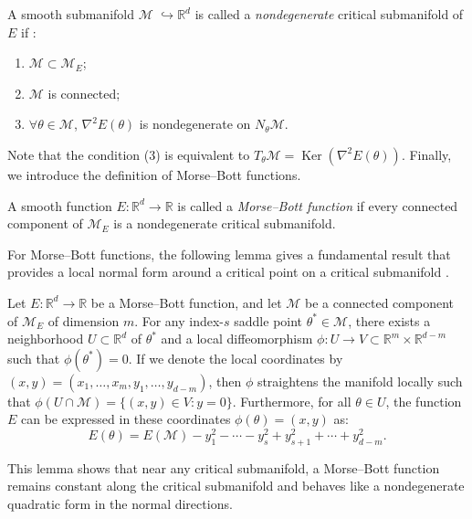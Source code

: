 \documentclass[final]{siamart251216}
\begin{document}
\begin{definition}
A smooth submanifold $\mathcal{M}$ $\hookrightarrow \mathbb{R}^d$ is called a \emph{nondegenerate} critical submanifold of $E$ if \cite{nicolaescu2007invitation}:
\begin{enumerate}
\item[(1)] $\mathcal{M}\subset \mathcal{M}_E$;
\item[(2)] $\mathcal{M}$ is connected;
\item[(3)] $\forall \theta\in \mathcal{M}$, $\nabla^2 E(\theta)$ is nondegenerate on $N_{\theta} \mathcal{M}$.
\end{enumerate}
\end{definition}
Note that the condition (3) is equivalent to $T_{\theta} \mathcal{M}=\operatorname{Ker} (\nabla^2 E(\theta))$.
Finally, we introduce the definition of Morse--Bott functions.
\begin{definition}
A smooth function $E:\mathbb{R}^d\to\mathbb{R}$ is called a \emph{Morse--Bott function} if every connected component of $\mathcal{M}_E$ is a nondegenerate critical submanifold.
\end{definition}


For Morse--Bott functions, the following lemma gives a fundamental result that provides a local normal form around a critical point on a critical submanifold \cite{Banyaga2004}.
\begin{lemma}
\label{lemma:bott}
Let $E: \mathbb{R}^d \to \mathbb{R}$ be a Morse--Bott function, and let $\mathcal{M}$ be a connected component of $\mathcal{M}_E$ of dimension $m$. 
For any index-$s$ saddle point $\theta^* \in \mathcal{M}$, there exists a neighborhood $U\subset \mathbb{R}^d $ of $\theta^*$ and a local diffeomorphism $\phi: U \to V \subset \mathbb{R}^m \times \mathbb{R}^{d-m}$ such that $\phi(\theta^*) = 0$.
If we denote the local coordinates by $(x, y) = (x_1, \ldots, x_m, y_1, \ldots, y_{d-m})$, then $\phi$ straightens the manifold locally such that $\phi(U \cap \mathcal{M}) = \{(x, y) \in V : y = 0\}$. 
Furthermore, for all $\theta\in U$, the function $E$ can be expressed in these coordinates $\phi(\theta)=(x,y)$ as:
\begin{equation}\label{eqn:morsebott}
E(\theta) = E(\mathcal{M}) - y_1^2 - \cdots - y_s^2 + y_{s+1}^2 + \cdots + y_{d-m}^2.
\end{equation}
\end{lemma}
This lemma shows that near any critical submanifold, a Morse--Bott function remains constant along the critical submanifold and behaves like a nondegenerate quadratic form in the normal directions.
\end{document}
